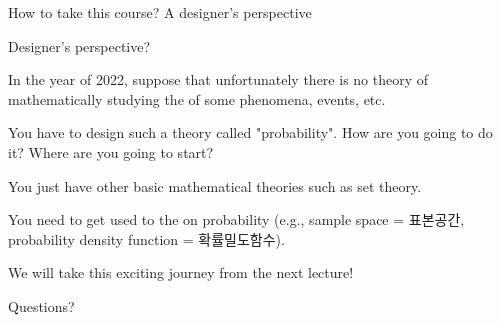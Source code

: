 \begin{frame}{How to take this course? A designer's perspective}

\bci

\item<1-> Designer's perspective?

\item<2-> In the year of 2022, suppose that unfortunately there is no theory of mathematically studying
the  of some phenomena, events, etc.

\item<3-> You have to design such a theory called "probability". How are you going to do it? Where are you going to start?


\item<3-> You just have other basic mathematical theories such as set theory.

\item<4-> You need to get used to the  on probability (e.g., sample space = 표본공간, probability density function = 확률밀도함수).

\item<5-> We will take this exciting journey from the next lecture!
\eci

\end{frame}


\begin{frame}{}

{
\vspace{2cm}
\centering
\LARGE Questions?
}
{
\centering
{}
}
\end{frame}



